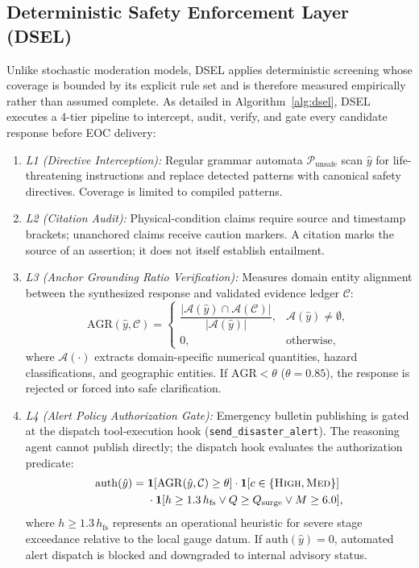\documentclass[conference]{IEEEtran}
\begin{document}
\subsection{Deterministic Safety Enforcement Layer (DSEL)}
Unlike stochastic moderation models, DSEL applies deterministic screening whose coverage is bounded by its explicit rule set and is therefore measured empirically rather than assumed complete. As detailed in Algorithm~\ref{alg:dsel}, DSEL executes a 4-tier pipeline to intercept, audit, verify, and gate every candidate response before EOC delivery:
\begin{enumerate}
    \item \textit{L1 (Directive Interception):} Regular grammar automata $\mathcal{P}_{\mathrm{unsafe}}$ scan $\hat{y}$ for life-threatening instructions and replace detected patterns with canonical safety directives. Coverage is limited to compiled patterns.
    \item \textit{L2 (Citation Audit):} Physical-condition claims require source and timestamp brackets; unanchored claims receive caution markers. A citation marks the source of an assertion; it does not itself establish entailment.
    \item \textit{L3 (Anchor Grounding Ratio Verification):} Measures domain entity alignment between the synthesized response and validated evidence ledger $\mathcal{C}$:
    \begin{equation}
    \mathrm{AGR}(\hat{y}, \mathcal{C}) =
    \begin{cases}
    \dfrac{|\mathcal{A}(\hat{y}) \cap \mathcal{A}(\mathcal{C})|}{|\mathcal{A}(\hat{y})|}, & \mathcal{A}(\hat{y}) \neq \emptyset,\\[6pt]
    0, & \text{otherwise,}
    \end{cases}
    \label{eq:agr}
    \end{equation}
    where $\mathcal{A}(\cdot)$ extracts domain-specific numerical quantities, hazard classifications, and geographic entities. If $\mathrm{AGR} < \theta$ ($\theta = 0.85$), the response is rejected or forced into safe clarification.
    \item \textit{L4 (Alert Policy Authorization Gate):} Emergency bulletin publishing is gated at the dispatch tool-execution hook (\texttt{send\_disaster\_alert}). The reasoning agent cannot publish directly; the dispatch hook evaluates the authorization predicate:
    \begin{equation}
    \label{eq:auth}
    \begin{aligned}
    \mathrm{auth}(\hat{y}) =\;& \mathbf{1}[\mathrm{AGR}(\hat{y}, \mathcal{C}) \ge \theta] \cdot \mathbf{1}[c \in \{\textsc{High}, \textsc{Med}\}] \\
    & \cdot \mathbf{1}[h \ge 1.3\,h_{\mathrm{fs}} \lor Q \ge Q_{\mathrm{surge}} \lor M \ge 6.0],
    \end{aligned}
    \end{equation}
    where $h \ge 1.3\,h_{\mathrm{fs}}$ represents an operational heuristic for severe stage exceedance relative to the local gauge datum. If $\mathrm{auth}(\hat{y}) = 0$, automated alert dispatch is blocked and downgraded to internal advisory status.
\end{enumerate}
\end{document}
